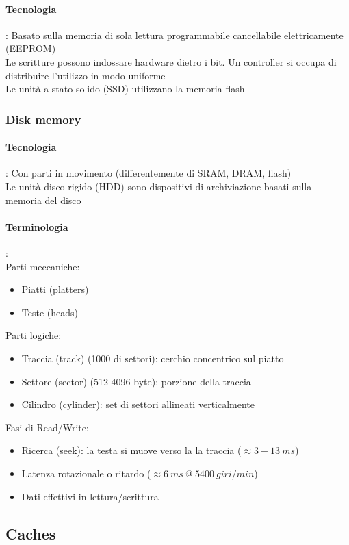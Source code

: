 \documentclass[12pt,a4paper]{article}
\begin{document}
\paragraph{Tecnologia}: Basato sulla memoria di sola lettura programmabile cancellabile elettricamente (EEPROM)\\
Le scritture possono indossare hardware dietro i bit. Un controller si occupa di distribuire l'utilizzo in modo uniforme\\
Le unità a stato solido (SSD) utilizzano la memoria flash

\subsubsection{Disk memory}
\paragraph{Tecnologia}: Con parti in movimento (differentemente di SRAM, DRAM, flash)\\
Le unità disco rigido (HDD) sono dispositivi di archiviazione basati sulla memoria del disco
\paragraph{Terminologia}:\\
Parti meccaniche:
\begin{itemize}
\item Piatti (platters)
\item Teste (heads)
\end{itemize}
Parti logiche:
\begin{itemize}
\item Traccia (track) (1000 di settori): cerchio concentrico sul piatto
\item Settore (sector) (512-4096 byte): porzione della traccia
\item Cilindro (cylinder): set di settori allineati verticalmente
\end{itemize}
Fasi di Read/Write:
\begin{itemize}
\item Ricerca (seek): la testa si muove verso la la traccia ($\approx 3-13\ ms$)
\item Latenza rotazionale o ritardo ($\approx 6\ ms\ @\ 5400\ giri/min$)
\item Dati effettivi in lettura/scrittura
\end{itemize}

\subsection{Caches}
\end{document}
